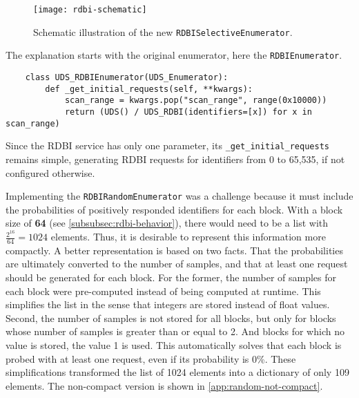 \begin{figure}[h]
    \centering
    \texttt{[image: rdbi-schematic]}
    \caption{Schematic illustration of the new \texttt{RDBISelectiveEnumerator}.}
    \label{fig:rdbi-schematic}
\end{figure}

The explanation starts with the original enumerator, here the \texttt{RDBIEnumerator}.

\begin{samepage}
\begin{verbatim}
    class UDS_RDBIEnumerator(UDS_Enumerator):
        def _get_initial_requests(self, **kwargs):
            scan_range = kwargs.pop("scan_range", range(0x10000))
            return (UDS() / UDS_RDBI(identifiers=[x]) for x in scan_range)
\end{verbatim}
\end{samepage}

Since the RDBI service has only one parameter, its \texttt{_get_initial_requests} remains simple, generating RDBI requests for identifiers from 0 to 65,535, if not configured otherwise.

Implementing the \texttt{RDBIRandomEnumerator} was a challenge because it must include the probabilities of positively responded identifiers for each block. With a block size of \textbf{64} (see \autoref{subsubsec:rdbi-behavior}), there would need to be a list with $\frac{2^{16}}{64} = 1024$ elements. Thus, it is desirable to represent this information more compactly. A better representation is based on two facts. That the probabilities are ultimately converted to the number of samples, and that at least one request should be generated for each block. For the former, the number of samples for each block were pre-computed instead of being computed at runtime. This simplifies the list in the sense that integers are stored instead of float values. Second, the number of samples is not stored for all blocks, but only for blocks whose number of samples is greater than or equal to 2. And blocks for which no value is stored, the value 1 is used. This automatically solves that each block is probed with at least one request, even if its probability is 0\%. These simplifications transformed the list of 1024 elements into a dictionary of only 109 elements. The non-compact version is shown in \autoref{app:random-not-compact}.

